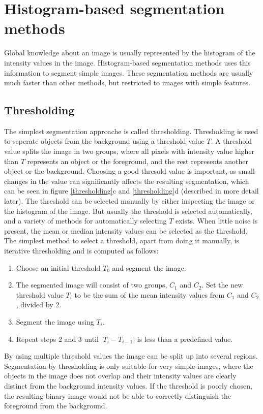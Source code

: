 \section{Histogram-based segmentation methods}
Global knowledge about an image is usually represented by the histogram of the intensity values in the image. Histogram-based segmentation methods uses this information to segment simple images. These segmentation methods are usually much faster than other methods, but restricted to images with simple features. 

\subsection{Thresholding}
The simplest segmentation approache is called thresholding. Thresholding is used to seperate objects from the background using a threshold value \(T\). A threshold value splits the image in two groups, where all pixels with intensity value higher than \(T\) represents an object or the foreground, and the rest represents another object or the background. Choosing a good thresold value is important, as small changes in the value can significantly affects the resulting segmentation, which can be seen in figure \ref{thresholding}c and \ref{thresholding}d (described in more detail later). The threshold can be selected manually by either inspecting the image or the histogram of the image. But usually the threshold is selected automatically, and a variety of methods for automatically selecting \(T\) exists. When little noise is present, the mean or median intensity values can be selected as the threshold. The simplest method to select a threshold, apart from doing it manually, is iterative thresholding and is computed as follows:
\begin{enumerate}
\item Choose an initial threshold \(T_{0}\) and segment the image.
\item The segmented image will consist of two groups, \(C_{1}\) and \(C_{2}\). Set the new threshold value \(T_{i}\) to be the sum of the mean intensity values from \(C_{1}\) and \(C_{2}\), divided by 2.
\item Segment the image using \(T_{i}\).
\item Repeat steps 2 and 3 until \(|T_{i} - T_{i-1}|\) is less than a predefined value.
\end{enumerate}
 
By using multiple threshold values the image can be split up into several regions. Segmentation by thresholding is only suitable for very simple images, where the objects in the image does not overlap and their intensity values are clearly distinct from the background intensity values. If the threshold is poorly chosen, the resulting binary image would not be able to correctly distinguish the foreground from the background.  

